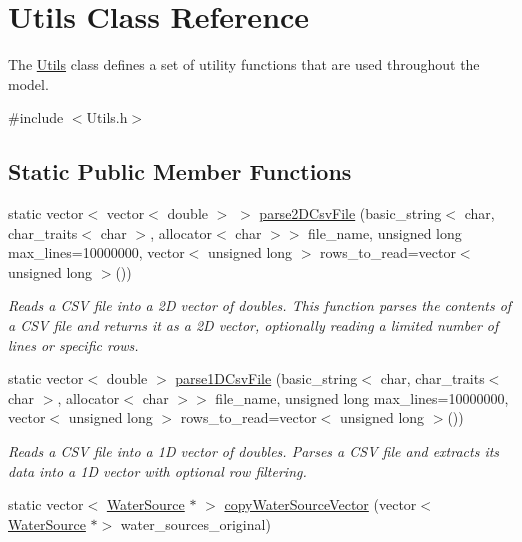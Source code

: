 \hypertarget{classUtils}{}\section{Utils Class Reference}
\label{classUtils}


The \mbox{\hyperlink{classUtils}{Utils}} class defines a set of utility functions that are used throughout the model.  




{\ttfamily \#include $<$Utils.\+h$>$}

\subsection*{Static Public Member Functions}
\begin{DoxyCompactItemize}
\item 
static vector$<$ vector$<$ double $>$ $>$ \mbox{\hyperlink{classUtils_a70b9475aafa3277b7d177a74752263bf}{parse2\+D\+Csv\+File}} (basic\+\_\+string$<$ char, char\+\_\+traits$<$ char $>$, allocator$<$ char $>$$>$ file\+\_\+name, unsigned long max\+\_\+lines=10000000, vector$<$ unsigned long $>$ rows\+\_\+to\+\_\+read=vector$<$ unsigned long $>$())
\begin{DoxyCompactList}\small\item\em Reads a C\+SV file into a 2D vector of doubles. This function parses the contents of a C\+SV file and returns it as a 2D vector, optionally reading a limited number of lines or specific rows. \end{DoxyCompactList}\item 
static vector$<$ double $>$ \mbox{\hyperlink{classUtils_a42fdb9455286213b32abf5f111c21fd4}{parse1\+D\+Csv\+File}} (basic\+\_\+string$<$ char, char\+\_\+traits$<$ char $>$, allocator$<$ char $>$$>$ file\+\_\+name, unsigned long max\+\_\+lines=10000000, vector$<$ unsigned long $>$ rows\+\_\+to\+\_\+read=vector$<$ unsigned long $>$())
\begin{DoxyCompactList}\small\item\em Reads a C\+SV file into a 1D vector of doubles. Parses a C\+SV file and extracts its data into a 1D vector with optional row filtering. \end{DoxyCompactList}\item 
static vector$<$ \mbox{\hyperlink{classWaterSource}{Water\+Source}} $\ast$ $>$ \mbox{\hyperlink{classUtils_af50f672b3a5c4790386d943e04e960f9}{copy\+Water\+Source\+Vector}} (vector$<$ \mbox{\hyperlink{classWaterSource}{Water\+Source}} $\ast$$>$ water\+\_\+sources\+\_\+original)
$$
\end{DoxyCompactItemize}
